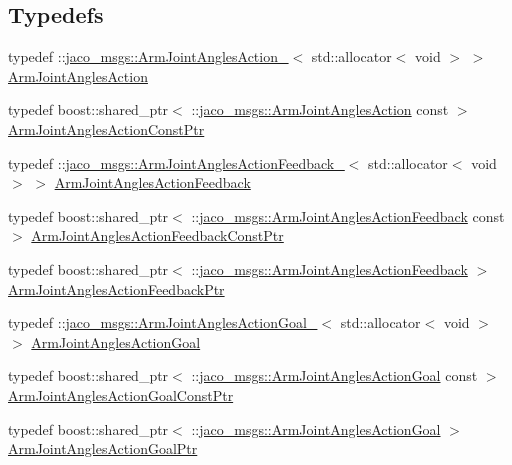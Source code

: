 \subsection*{Typedefs}
\begin{DoxyCompactItemize}
\item 
typedef \+::\hyperlink{structjaco__msgs_1_1ArmJointAnglesAction__}{jaco\+\_\+msgs\+::\+Arm\+Joint\+Angles\+Action\+\_\+}$<$ std\+::allocator$<$ void $>$ $>$ \hyperlink{namespacejaco__msgs_afc04c716621af8a0dfe0968d1db0f90c}{Arm\+Joint\+Angles\+Action}
\item 
typedef boost\+::shared\+\_\+ptr$<$ \+::\hyperlink{namespacejaco__msgs_afc04c716621af8a0dfe0968d1db0f90c}{jaco\+\_\+msgs\+::\+Arm\+Joint\+Angles\+Action} const  $>$ \hyperlink{namespacejaco__msgs_ae669d71e95bd7ea4a487c1f7462ee8bf}{Arm\+Joint\+Angles\+Action\+Const\+Ptr}
\item 
typedef \+::\hyperlink{structjaco__msgs_1_1ArmJointAnglesActionFeedback__}{jaco\+\_\+msgs\+::\+Arm\+Joint\+Angles\+Action\+Feedback\+\_\+}$<$ std\+::allocator$<$ void $>$ $>$ \hyperlink{namespacejaco__msgs_a68c064fac934e7282ecc3b9e238706fb}{Arm\+Joint\+Angles\+Action\+Feedback}
\item 
typedef boost\+::shared\+\_\+ptr$<$ \+::\hyperlink{namespacejaco__msgs_a68c064fac934e7282ecc3b9e238706fb}{jaco\+\_\+msgs\+::\+Arm\+Joint\+Angles\+Action\+Feedback} const  $>$ \hyperlink{namespacejaco__msgs_ac322e8c0636bb54757f6caed5acfea74}{Arm\+Joint\+Angles\+Action\+Feedback\+Const\+Ptr}
\item 
typedef boost\+::shared\+\_\+ptr$<$ \+::\hyperlink{namespacejaco__msgs_a68c064fac934e7282ecc3b9e238706fb}{jaco\+\_\+msgs\+::\+Arm\+Joint\+Angles\+Action\+Feedback} $>$ \hyperlink{namespacejaco__msgs_a71872d8ba4a458ac1d726aaf1590fcb7}{Arm\+Joint\+Angles\+Action\+Feedback\+Ptr}
\item 
typedef \+::\hyperlink{structjaco__msgs_1_1ArmJointAnglesActionGoal__}{jaco\+\_\+msgs\+::\+Arm\+Joint\+Angles\+Action\+Goal\+\_\+}$<$ std\+::allocator$<$ void $>$ $>$ \hyperlink{namespacejaco__msgs_a470a23a1c9e2f50a7fb922b297d0196d}{Arm\+Joint\+Angles\+Action\+Goal}
\item 
typedef boost\+::shared\+\_\+ptr$<$ \+::\hyperlink{namespacejaco__msgs_a470a23a1c9e2f50a7fb922b297d0196d}{jaco\+\_\+msgs\+::\+Arm\+Joint\+Angles\+Action\+Goal} const  $>$ \hyperlink{namespacejaco__msgs_a13dda2d3f78d7022a00c1ec6e28bc4f5}{Arm\+Joint\+Angles\+Action\+Goal\+Const\+Ptr}
\item 
typedef boost\+::shared\+\_\+ptr$<$ \+::\hyperlink{namespacejaco__msgs_a470a23a1c9e2f50a7fb922b297d0196d}{jaco\+\_\+msgs\+::\+Arm\+Joint\+Angles\+Action\+Goal} $>$ \hyperlink{namespacejaco__msgs_afa31432479719cc4ba185bef68605370}{Arm\+Joint\+Angles\+Action\+Goal\+Ptr}

\end{DoxyCompactItemize}
